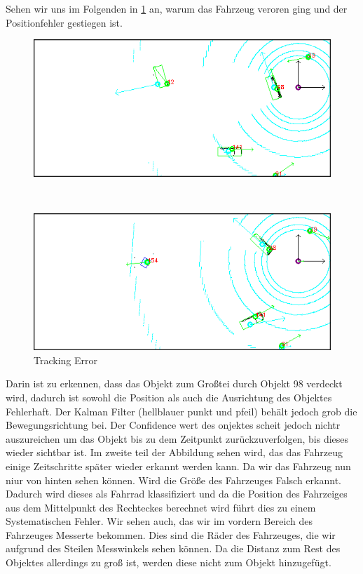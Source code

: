 \documentclass[11pt,oneside,openright]{mpreport}
\begin{document}
Sehen wir uns im Folgenden in \cref{lost} an, warum das Fahrzeug veroren ging und der Positionfehler gestiegen ist.

\begin{figure}[htb]
  \caption{Tracking Error} 
    \centering
    \begin{minipage}[t]{\textwidth}
        \centering
        \includegraphics[width=\textwidth]{bilder/alg/lost.png}
    \end{minipage}%
    \\
    \begin{minipage}[t]{\textwidth}
        \centering
	\includegraphics[width=\textwidth]{bilder/alg/redetect.png}
    \end{minipage}
    \label{lost}
\end{figure}

Darin ist zu erkennen, dass das Objekt  zum Großtei durch Objekt 98 verdeckt wird,  dadurch ist sowohl die Position als auch die Ausrichtung des Objektes Fehlerhaft.
Der Kalman Filter (hellblauer punkt und pfeil) behält jedoch grob die Bewegungsrichtung bei. Der Confidence wert des onjektes scheit jedoch nichtr auszureichen um das Objekt bis zu dem
Zeitpunkt zurückzuverfolgen, bis dieses wieder sichtbar ist. Im zweite teil der Abbildung sehen wird, das das Fahrzeug einige Zeitschritte später wieder erkannt werden kann.
Da wir das Fahrzeug nun niur von hinten sehen können. Wird die Größe des Fahrzeuges Falsch erkannt. Dadurch wird dieses als Fahrrad klassifiziert und da die Position
des Fahrzeiges aus dem Mittelpunkt des Rechteckes berechnet wird führt dies zu einem Systematischen Fehler. Wir sehen auch, das wir im vordern Bereich des Fahrzeuges Messerte bekommen.
Dies sind die Räder des Fahrzeuges, die wir aufgrund des Steilen Messwinkels sehen können. Da die Distanz zum Rest des Objektes allerdings zu groß ist, werden diese nicht 
zum Objekt hinzugefügt.
\end{document}
